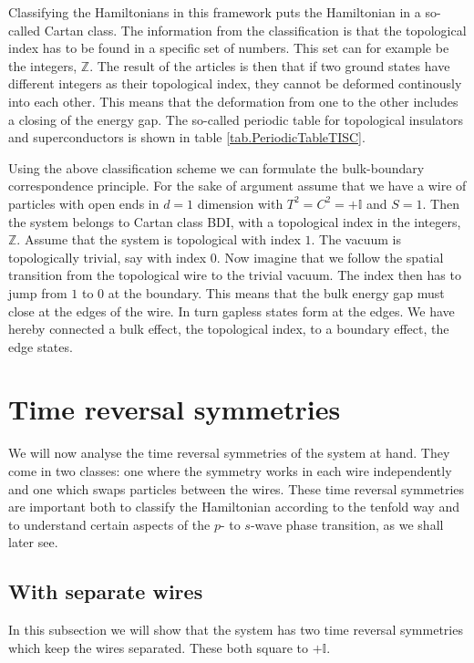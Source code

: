Classifying the Hamiltonians in this framework puts the Hamiltonian in a so-called Cartan class. The information from the classification is that the topological index has to be found in a specific set of numbers. This set can for example be the integers, $\mathbb{Z}$. The result of the articles is then that if two ground states have different integers as their topological index, they cannot be deformed continously into each other. This means that the deformation from one to the other includes a closing of the energy gap. The so-called periodic table for topological insulators and superconductors is shown in table \ref{tab.PeriodicTableTISC}.

Using the above classification scheme we can formulate the bulk-boundary correspondence principle. For the sake of argument assume that we have a wire of particles with open ends in $d = 1$ dimension with $T^2 = C^2 = +\mathbb{I}$ and $S = 1$. Then the system belongs to Cartan class BDI, with a topological index in the integers, $\mathbb{Z}$. Assume that the system is topological with index $1$. The vacuum is topologically trivial, say with index $0$. Now imagine that we follow the spatial transition from the topological wire to the trivial vacuum. The index then has to jump from $1$ to $0$ at the boundary. This means that the bulk energy gap must close at the edges of the wire. In turn gapless states form at the edges. We have hereby connected a bulk effect, the topological index, to a boundary effect, the edge states. 

\section{Time reversal symmetries} \label{sec.2wirestimereversalsymmetries}
We will now analyse the time reversal symmetries of the system at hand. They come in two classes: one where the symmetry works in each wire independently and one which swaps particles between the wires. These time reversal symmetries are important both to classify the Hamiltonian according to the tenfold way and to understand certain aspects of the $p$- to $s$-wave phase transition, as we shall later see. 

\subsection{With separate wires} 
\label{subsec.TRseparatewires}
In this subsection we will show that the system has two time reversal symmetries which keep the wires separated. These both square to $+\mathbb{I}$.

